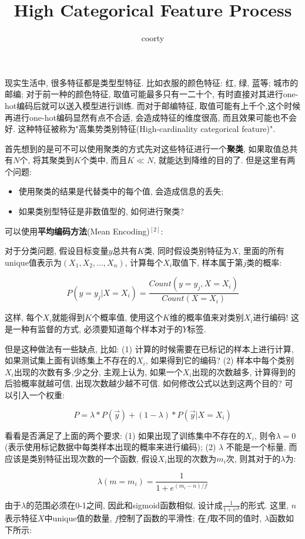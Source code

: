 \documentclass[UTF8,a4paper,11pt]{article}
\author{coorty}
\title{High Categorical Feature Process}
\begin{document}
\maketitle
现实生活中, 很多特征都是类型型特征. 比如衣服的颜色特征: 红, 绿, 蓝等; 城市的邮编; 对于前一种的颜色特征, 取值可能最多只有一二十个, 有时直接对其进行one-hot编码后就可以送入模型进行训练. 而对于邮编特征, 取值可能有上千个,这个时候再进行one-hot编码显然有点不合适, 会造成特征的维度很高, 而且效果可能也不会好. 这种特征被称为"高集势类别特征(High-cardinality categorical feature)". 

首先想到的是可不可以使用聚类的方式先对这些特征进行一个\textbf{聚类}, 如果取值总共有$N$个, 将其聚类到$K$个类中, 而且$K \ll N$, 就能达到降维的目的了. 但是这里有两个问题:

\begin{itemize}
\item 使用聚类的结果是代替类中的每个值, 会造成信息的丢失;
\item 如果类别型特征是非数值型的, 如何进行聚类? 	
\end{itemize}
	
可以使用\textbf{平均编码方法}(Mean Encoding)$^{[2]}$:

对于分类问题, 假设目标变量$y$总共有$K$类, 同时假设类别特征为$X$, 里面的所有unique值表示为$(X_1, X_2,...,X_n)$, 计算每个$X_i$取值下, 样本属于第$j$类的概率: 

$$ P(y=y_j|X=X_i) = \frac{Count(y=y_j, X=X_i)}{Count(X=X_i)} $$

这样, 每个$X_i$就能得到$K$个概率值, 使用这个$K$维的概率值来对类别$X_i$进行编码! 这是一种有监督的方式, 必须要知道每个样本对于的$Y$标签.

但是这种做法有一些缺点, 比如: (1) 计算的时候需要在已标记的样本上进行计算, 如果测试集上面有训练集上不存在的$X_i$, 如果得到它的编码? (2) 样本中每个类别$X_i$出现的次数有多,少之分, 主观上认为, 如果一个$X_i$出现的次数越多, 计算得到的后验概率就越可信, 出现次数越少越不可信. 如何修改公式以达到这两个目的? 可以引入一个权重:

$$ P=\lambda * P(\vec{y}) + (1-\lambda)*P(\vec{y}|X=X_i) $$

看看是否满足了上面的两个要求: (1) 如果出现了训练集中不存在的$X_i$, 则令$\lambda=0$(表示使用标记数据中每类样本出现的概率来进行编码); (2) $\lambda$ 不能是一个标量, 而应该是类别特征出现次数的一个函数, 假设$X_i$出现的次数为$m_i$次, 则其对于的$\lambda$为:

$$ \lambda (m=m_i) = \frac{1}{1+e^{(m_i-n)/f}} $$

由于$\lambda$的范围必须在0-1之间, 因此和sigmoid函数相似, 设计成$\frac{1}{1+e^{\Delta}}$的形式. 这里, $n$表示特征$X$中unique值的数量, $f$控制了函数的平滑性; 在$f$取不同的值时, $\lambda$函数如下所示:
\end{document}
